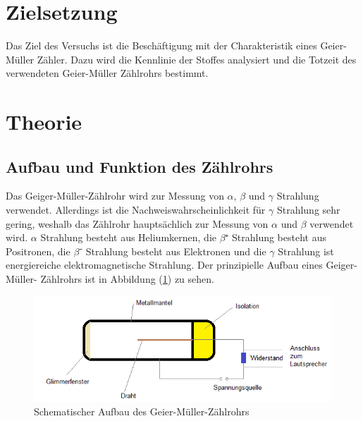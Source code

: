 \section{Zielsetzung}
\label{sec:Zielsetzung}
Das Ziel des Versuchs ist die Beschäftigung mit der Charakteristik eines Geier-Müller 
Zähler. Dazu wird die Kennlinie der Stoffes  analysiert und 
die Totzeit des verwendeten Geier-Müller Zählrohrs bestimmt.
\section{Theorie}
\label{sec:Theorie}
\subsection{Aufbau und Funktion des Zählrohrs}
Das Geiger-Müller-Zählrohr wird zur Messung von $\alpha$, $\beta$ 
und $\gamma$ Strahlung verwendet. Allerdings ist die 
Nachweiswahrscheinlichkeit für $\gamma$ Strahlung sehr gering, weshalb das Zählrohr
hauptsächlich zur Messung von $\alpha$ und $\beta$ verwendet wird. $\alpha$ 
Strahlung besteht aus Heliumkernen, die $\beta⁺$ Strahlung besteht aus Positronen, die
$\beta⁻$ Strahlung besteht aus Elektronen und die $\gamma$ Strahlung ist energiereiche elektromagnetische 
Strahlung. Der prinzipielle Aufbau eines Geiger-Müller-
Zählrohrs ist in Abbildung (\ref{fig:Aufbau}) zu sehen. 
\begin{figure}[H]
    \centering
    \includegraphics[width=\textwidth]{content/Bilder/Zaehlrohr_Aufbau.png}
    \caption{Schematischer Aufbau des Geier-Müller-Zählrohrs \cite{Aufbau}}
    \label{fig:Aufbau}
\end{figure}

